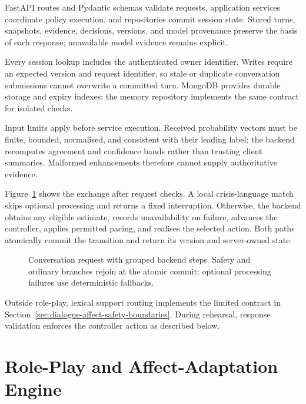 FastAPI routes and Pydantic schemas validate requests, application services coordinate policy execution, and repositories commit session state. Stored turns, snapshots, evidence, decisions, versions, and model provenance preserve the basis of each response; unavailable model evidence remains explicit.
\label{subsec:backend-service-architecture}
\label{subsec:backend-domain-models}

Every session lookup includes the authenticated owner identifier. Writes require an expected version and request identifier, so stale or duplicate conversation submissions cannot overwrite a committed turn. MongoDB provides durable storage and expiry indexes; the memory repository implements the same contract for isolated checks.
\label{subsec:backend-authentication}
\label{subsec:backend-session-persistence}

Input limits apply before service execution. Received probability vectors must be finite, bounded, normalised, and consistent with their leading label; the backend recomputes agreement and confidence bands rather than trusting client summaries. Malformed enhancements therefore cannot supply authoritative evidence.

Figure~\ref{fig:request-sequence} shows the exchange after request checks. A local crisis-language match skips optional processing and returns a fixed interruption. Otherwise, the backend obtains any eligible estimate, records unavailability on failure, advances the controller, applies permitted pacing, and realises the selected action. Both paths atomically commit the transition and return its version and server-owned state.
\label{subsec:backend-conversation-processing}
\label{subsec:safety-precedence}

\begin{figure}[!htbp]
\centering

\caption[Conversation request with safety precedence and a shared commit step.]{Conversation request with grouped backend steps. Safety and ordinary branches rejoin at the atomic commit; optional processing failures use deterministic fallbacks.}
\label{fig:request-sequence}
\end{figure}

Outside role-play, lexical support routing implements the limited contract in Section~\ref{sec:dialogue-affect-safety-boundaries}. During rehearsal, response validation enforces the controller action as described below.
\label{subsec:backend-fallbacks}
\label{subsec:cognitive-support-routing}

\section{Role-Play and Affect-Adaptation Engine}
\label{sec:roleplay-adaptation}

